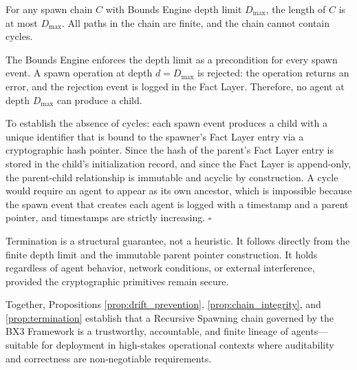 \begin{prop}[Termination]\label{prop:termination}
For any spawn chain $C$ with Bounds Engine depth limit $D_{\max}$, the length of $C$ is at most $D_{\max}$. All paths in the chain are finite, and the chain cannot contain cycles.
\end{prop}

\begin{Proof}[Sketch]
The Bounds Engine enforces the depth limit as a precondition for every spawn event. A spawn operation at depth $d = D_{\max}$ is rejected: the operation returns an error, and the rejection event is logged in the Fact Layer. Therefore, no agent at depth $D_{\max}$ can produce a child.

To establish the absence of cycles: each spawn event produces a child with a unique identifier that is bound to the spawner's Fact Layer entry via a cryptographic hash pointer. Since the hash of the parent's Fact Layer entry is stored in the child's initialization record, and since the Fact Layer is append-only, the parent-child relationship is immutable and acyclic by construction. A cycle would require an agent to appear as its own ancestor, which is impossible because the spawn event that creates each agent is logged with a timestamp and a parent pointer, and timestamps are strictly increasing. $\square$
\end{Proof}

Termination is a structural guarantee, not a heuristic. It follows directly from the finite depth limit and the immutable parent pointer construction. It holds regardless of agent behavior, network conditions, or external interference, provided the cryptographic primitives remain secure.

Together, Propositions \ref{prop:drift_prevention}, \ref{prop:chain_integrity}, and \ref{prop:termination} establish that a Recursive Spawning chain governed by the BX3 Framework is a trustworthy, accountable, and finite lineage of agents—suitable for deployment in high-stakes operational contexts where auditability and correctness are non-negotiable requirements.